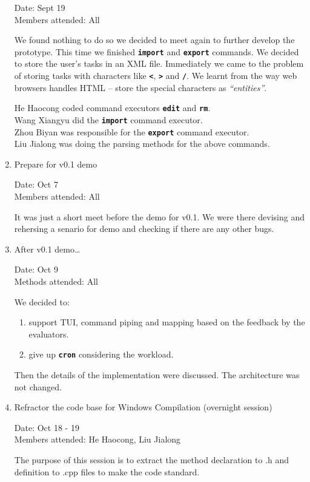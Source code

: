 \documentclass[12pt, a4paper]{article}
\newcommand{\cmdinline}[1]{{\bf \texttt{#1}}}
\begin{document}
\begin{enumerate}
Date: Sept 19\\
Members attended: All

We found nothing to do so we decided to meet again to further develop the prototype. This time we finished \cmdinline{import} and \cmdinline{export} commands. We decided to store the user's tasks in an XML file. Immediately we came to the problem of storing tasks with characters like \cmdinline{<}, \cmdinline{>} and \cmdinline{/}. We learnt from the way web browsers handles HTML -- store the special characters as \emph{``entities''}.

He Haocong coded command executors \cmdinline{edit} and \cmdinline{rm}.\\
Wang Xiangyu did the \cmdinline{import} command executor.\\
Zhou Biyan was responsible for the \cmdinline{export} command executor.\\
Liu Jialong was doing the parsing methods for the above commands. %

\item Prepare for v0.1 demo

  Date: Oct 7\\
  Members attended: All

It was just a short meet before the demo for v0.1. We were there devising and rehersing a senario for demo and checking if there are any other bugs. 

\item After v0.1 demo\ldots

  Date: Oct 9\\
  Methods attended: All

We decided to:
\begin{enumerate}
\item  support TUI, command piping and mapping based on the feedback by the evaluators.
\item  give up \cmdinline{cron} considering the workload.
\end{enumerate}

Then the details of the implementation were discussed. The architecture was not changed.

\item Refractor the code base for Windows Compilation (overnight session)

Date: Oct 18 - 19\\
Members attended: He Haocong, Liu Jialong

The purpose of this session is to extract the method declaration to .h and definition to .cpp files to make the code standard.


\end{enumerate}
\end{document}
